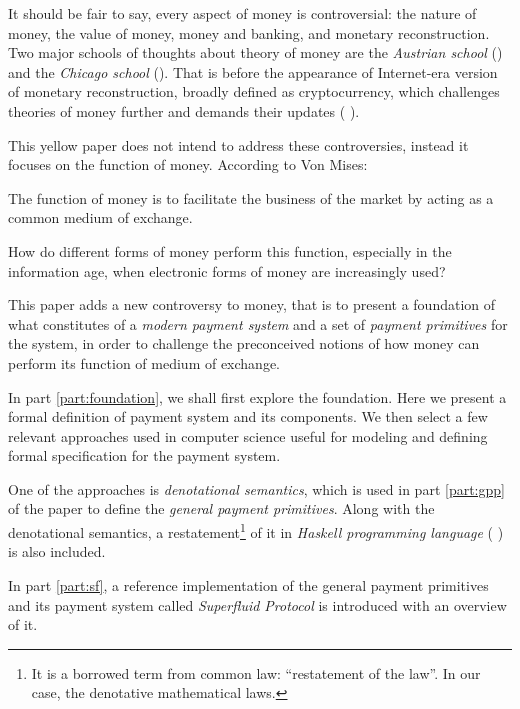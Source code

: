 It should be fair to say, every aspect of money is controversial: the nature of money, the value of
money, money and banking, and monetary reconstruction. Two major schools of thoughts about theory of
money are the \textit{Austrian school} (\cite{von2013theory}) and the \textit{Chicago school}
(\cite{friedman1989quantity}). That is before the appearance of Internet-era version of monetary
reconstruction, broadly defined as cryptocurrency, which challenges theories of money further and
demands their updates (\cite{ammous2018can} \cite{hardle2020understanding}).

This yellow paper does not intend to address these controversies, instead it focuses on the function
of money. According to Von Mises:

\begin{displayquote}
The function of money is to facilitate the business of the market by acting as a common medium of
exchange. 
\end{displayquote}

How do different forms of money perform this function, especially in the information age, when
electronic forms of money are increasingly used?

This paper adds a new controversy to money, that is to present a foundation of what constitutes of
a \textit{modern payment system} and a set of \textit{payment primitives} for the system, in order
to challenge the preconceived notions of how money can perform its function of medium of exchange.

In part \ref{part:foundation}, we shall first explore the foundation. Here we present a formal
definition of payment system and its components. We then select a few relevant approaches used in
computer science useful for modeling and defining formal specification for the payment system.

One of the approaches is \textit{denotational semantics}, which is used in part \ref{part:gpp} of
the paper to define the \textit{general payment primitives}. Along with the denotational semantics,
a restatement\footnote{It is a borrowed term from common law: ``restatement of the law''. In our
case, the denotative mathematical laws.} of it in \textit{Haskell programming language}
(\cite{hudak1992report} \cite{jones2003haskell} \cite{marlow2010haskell}) is also included.

In part \ref{part:sf}, a reference implementation of the general payment primitives and its payment
system called \textit{Superfluid Protocol} is introduced with an overview of it.

